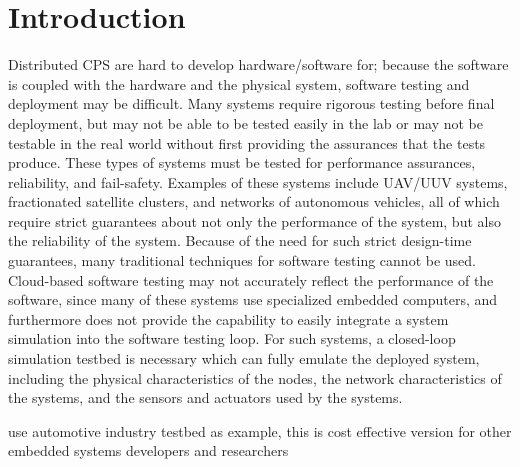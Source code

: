 \section{Introduction}

Distributed CPS are hard to develop hardware/software for; because the software is coupled with the hardware and the physical system, software testing and deployment may be difficult.  Many systems require rigorous testing before final deployment, but may not be able to be tested easily in the lab or may not be testable in the real world without first providing the assurances that the tests produce.  These types of systems must be tested for performance assurances, reliability, and fail-safety.  Examples of these systems include UAV/UUV systems, fractionated satellite clusters, and networks of autonomous vehicles, all of which require strict guarantees about not only the performance of the system, but also the reliability of the system.  Because of the need for such strict design-time guarantees, many traditional techniques for software testing cannot be used.  Cloud-based software testing may not accurately reflect the performance of the software, since many of these systems use specialized embedded computers, and furthermore does not provide the capability to easily integrate a system simulation into the software testing loop.  For such systems, a closed-loop simulation testbed is necessary which can fully emulate the deployed system, including the physical characteristics of the nodes, the network characteristics of the systems, and the sensors and actuators used by the systems.

use automotive industry testbed as example, this is cost effective version for other embedded systems developers and researchers
